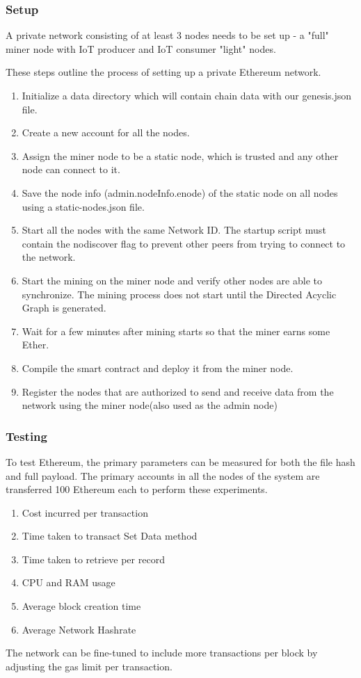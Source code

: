 \documentclass[11pt,openright]{report}
\begin{document}
\subsubsection{Setup}
A private network consisting of at least 3 nodes needs to be set up - a "full" miner node with IoT producer and IoT consumer "light" nodes.

These steps outline the process of setting up a private Ethereum network.
\begin{enumerate}
    \item Initialize a data directory which will contain chain data with our genesis.json file.
    \item Create a new account for all the nodes.
    \item Assign the miner node to be a static node, which is trusted and any other node can connect to it. 
    \item Save the node info (admin.nodeInfo.enode) of the static node on all nodes using a static-nodes.json file.
    \item Start all the nodes with the same Network ID. The startup script must contain the nodiscover flag to prevent other peers from trying to connect to the network.
    \item Start the mining on the miner node and verify other nodes are able to synchronize. The mining process does not start until the Directed Acyclic Graph is generated. 
    \item Wait for a few minutes after mining starts so that the miner earns some Ether. 
    \item Compile the smart contract and deploy it from the miner node.
    \item Register the nodes that are authorized to send and receive data from the network using the miner node(also used as the admin node)
\end{enumerate}


\subsubsection{Testing}
To test Ethereum, the primary parameters can be measured for both the file hash and full payload. The primary accounts in all the nodes of the system are transferred 100 Ethereum each to perform these experiments. 
\begin{enumerate}
    \item Cost incurred per transaction
    \item Time taken to transact Set Data method
    \item Time taken to retrieve per record
    \item CPU and RAM usage
    \item Average block creation time
    \item Average Network Hashrate
\end{enumerate}
The network can be fine-tuned to include more transactions per block by adjusting the gas limit per transaction.
\end{document}
